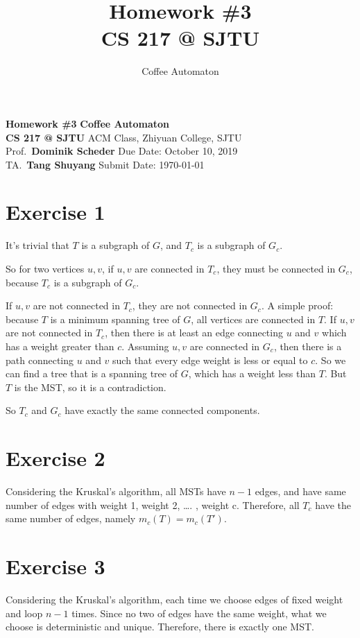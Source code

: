 \documentclass[
  11pt,
  a4paper,
]{article}
\title{
  \vspace{2in}
  \textmd{\textbf{Homework \#3}}
  \normalsize\vspace{0.1in}\\
  \textmd{\textbf{CS 217 @ SJTU}}
  \normalsize\vspace{0.1in}\\
}
\author{Coffee Automaton}
\date{}
\begin{document}
\noindent
\large\textbf{Homework \#3}
\hfill
\textbf{Coffee Automaton} \\
\normalsize {\bf CS 217 @ SJTU} \hfill ACM Class, Zhiyuan College, SJTU\\
Prof.~{\bf Dominik Scheder} \hfill Due Date: October 10, 2019\\
  TA.~{\bf Tang Shuyang}
\hfill Submit Date: \today


\hypertarget{exercise-1}{%
\section{Exercise 1}\label{exercise-1}}

It's trivial that \(T\) is a subgraph of \(G\), and \(T_{c}\) is a
subgraph of \(G_{c}\).

So for two vertices \(u,v\), if \(u,v\) are connected in \(T_{c}\), they
must be connected in \(G_{c}\), because \(T_{c}\) is a subgraph of
\(G_{c}\).

If \(u,v\) are not connected in \(T_{c}\), they are not connected in
\(G_{c}\). A simple proof: because \(T\) is a minimum spanning tree of
\(G\), all vertices are connected in \(T\). If \(u,v\) are not connected
in \(T_{c}\), then there is at least an edge connecting \(u\) and \(v\)
which has a weight greater than \(c\). Assuming \(u,v\) are connected in
\(G_{c}\), then there is a path connecting \(u\) and \(v\) such that
every edge weight is less or equal to \(c\). So we can find a tree that
is a spanning tree of \(G\), which has a weight less than \(T\). But
\(T\) is the MST, so it is a contradiction.

So \(T_c\) and \(G_c\) have exactly the same connected components.

\hypertarget{exercise-2}{%
\section{Exercise 2}\label{exercise-2}}

Considering the Kruskal's algorithm, all MSTs have \(n-1\) edges, and
have same number of edges with weight 1, weight 2, \ldots{}. , weight c.
Therefore, all \(T_c\) have the same number of edges, namely
\(m_{c}(T) = m_{c}(T')\).

\hypertarget{exercise-3}{%
\section{Exercise 3}\label{exercise-3}}

Considering the Kruskal's algorithm, each time we choose edges of fixed
weight and loop \(n-1\) times. Since no two of edges have the same
weight, what we choose is deterministic and unique. Therefore, there is
exactly one MST.
\end{document}
